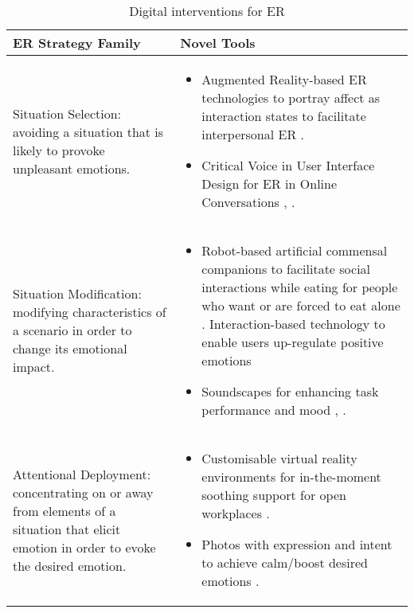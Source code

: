 \begin{table}[]
\centering
\caption{Digital interventions for ER\cite{smith2022digital}}
\label{tab:my-table}
\begin{tabular}{m{6cm}m{10cm}}
\hline
\textbf{ER Strategy Family}                                                                                                             & \textbf{Novel Tools}                                                                                                                                                                                                                                                       \\ \hline
Situation Selection: avoiding a situation that is likely to provoke unpleasant emotions.                                                 & \begin{itemize}
\item Augmented Reality-based ER technologies to portray affect as interaction states to facilitate interpersonal ER \cite{semertzidis2020neo}.
\item Critical Voice in User Interface Design for ER in Online Conversations \cite{kiskola2021applying}, \cite{kou2020emotion}.
\end{itemize}                             \\ \hline
Situation Modification: modifying characteristics of a scenario in order to change its emotional impact.                                 & \begin{itemize}
\item Robot-based artificial commensal companions to facilitate social interactions while eating for people who want or are forced to eat alone \cite{mancini2020room}. Interaction-based technology to enable users up-regulate positive emotions \cite{li2020purpal}
\item Soundscapes for enhancing task performance and mood \cite{newbold2017using}, \cite{yu2018delight}.
\end{itemize}                 \\ \hline
Attentional Deployment: concentrating on or away from elements of a situation that elicit emotion in order to evoke the desired emotion. & \begin{itemize}
\item Customisable virtual reality environments for in-the-moment soothing support for open workplaces \cite{ruvimova2020transport}.
\item Photos with expression and intent to achieve calm/boost desired emotions \cite{chen2016promoting}.

\end{itemize}
\end{tabular}
\end{table}
